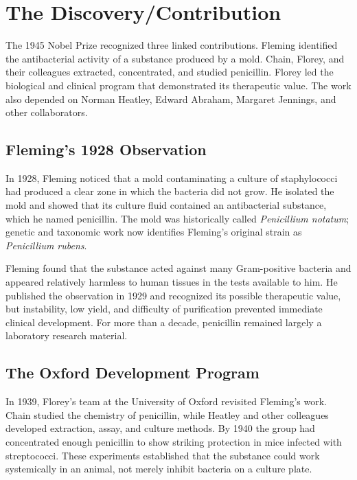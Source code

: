 \section{The Discovery/Contribution}

The 1945 Nobel Prize recognized three linked contributions. Fleming identified the antibacterial activity of a substance produced by a mold. Chain, Florey, and their colleagues extracted, concentrated, and studied penicillin. Florey led the biological and clinical program that demonstrated its therapeutic value. The work also depended on Norman Heatley, Edward Abraham, Margaret Jennings, and other collaborators.

\subsection{Fleming's 1928 Observation}

In 1928, Fleming noticed that a mold contaminating a culture of staphylococci had produced a clear zone in which the bacteria did not grow. He isolated the mold and showed that its culture fluid contained an antibacterial substance, which he named penicillin. The mold was historically called \textit{Penicillium notatum}; genetic and taxonomic work now identifies Fleming's original strain as \textit{Penicillium rubens}.

Fleming found that the substance acted against many Gram-positive bacteria and appeared relatively harmless to human tissues in the tests available to him. He published the observation in 1929 and recognized its possible therapeutic value, but instability, low yield, and difficulty of purification prevented immediate clinical development. For more than a decade, penicillin remained largely a laboratory research material.

\subsection{The Oxford Development Program}

In 1939, Florey's team at the University of Oxford revisited Fleming's work. Chain studied the chemistry of penicillin, while Heatley and other colleagues developed extraction, assay, and culture methods. By 1940 the group had concentrated enough penicillin to show striking protection in mice infected with streptococci. These experiments established that the substance could work systemically in an animal, not merely inhibit bacteria on a culture plate.

